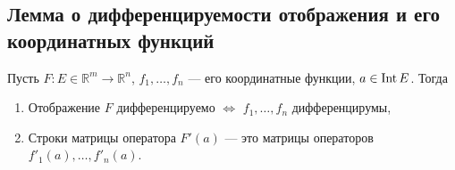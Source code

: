 \subsection{Лемма о дифференцируемости отображения и его координатных функций}
\hypertarget{t75}{}
\begin{theorem}
	Пусть \(F \colon E \in \mathbb{R}^m \to \mathbb{R}^n\), \(f_1, \ldots, f_n\) --- его координатные функции, \(a \in \operatorname{Int} E\). Тогда
	\begin{enumerate}
		\item Отображение \(F\) дифференцируемо \(\iff\) \(f_1, \ldots, f_n\) дифференцирумы,
		\item Строки матрицы оператора \(F'(a)\) --- это матрицы операторов \(f'_1(a), \ldots, f'_n(a)\). 
	\end{enumerate}
\end{theorem}
